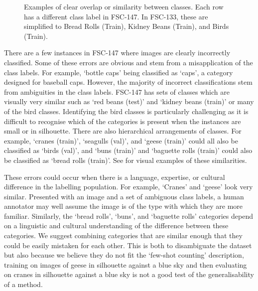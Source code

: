 \documentclass[../thesis.tex]{subfiles}
\begin{document}
\begin{figure}    
    \centering
    \fontsize{8}{8}\selectfont
    
    \caption{Examples of clear overlap or similarity between classes. Each row has a different class label in FSC-147. In FSC-133, these are simplified to Bread Rolls (Train), Kidney Beans (Train), and Birds (Train).}
    \label{fig__FSC133__arethesame}
\end{figure}

There are a few instances in FSC-147  where images are clearly incorrectly classified. 
Some of these errors are obvious and stem from a misapplication of the class labels.
For example, `bottle caps' being classified as `caps', a category designed for baseball caps. 
However, the majority of incorrect classifications stem from ambiguities in the class labels.
FSC-147 has sets of classes which are visually very similar such as `red beans (test)' and `kidney beans (train)' or many of the bird classes.
Identifying the bird classes is particularly challenging as it is difficult to recognise which of the categories is present when the instances are small or in silhouette.
There are also hierarchical arrangements of classes. 
For example, `cranes (train)', `seagulls (val)', and `geese (train)' could all also be classified as `birds (val)', and `buns (train)' and `baguette rolls (train)' could also be classified as `bread rolls (train)'. 
See  for visual examples of these similarities.

These errors could occur when there is a language, expertise, or cultural difference in the labelling population. For example, `Cranes' and `geese' look very similar. Presented with an image and a set of ambiguous class labels, a human annotator may well assume the image is of the type with which they are more familiar. 
Similarly, the `bread rolls', `buns', and `baguette rolls' categories depend on a linguistic and cultural understanding of the difference between these categories. 
We suggest combining categories that are similar enough that they could be easily mistaken for each other. This is both to disambiguate the dataset but also because we believe they do not fit the `few-shot counting' description, \eg training on images of geese in silhouette against a blue sky and then evaluating on cranes in silhouette against a blue sky is not a good test of the generalisability of a method.
\end{document}
